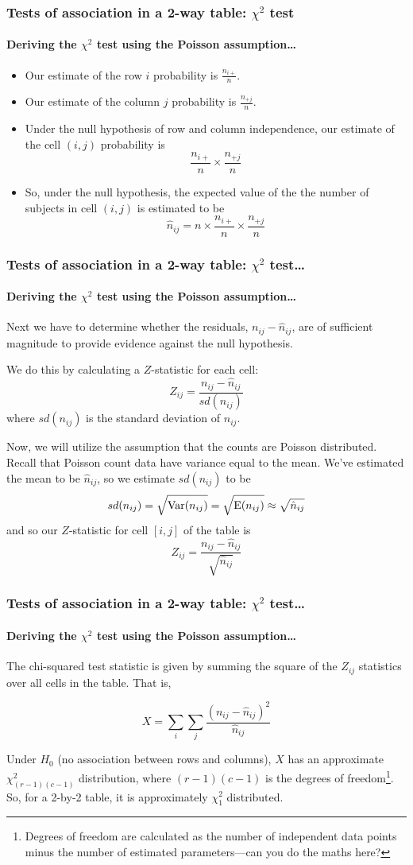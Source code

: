 \documentclass{beamer}\usepackage[]{graphicx}\usepackage[]{xcolor}
\begin{document}
\begin{frame}
\frametitle{Tests of association in a 2-way table: $\chi^2$ test}
\framesubtitle{Deriving the $\chi^2$ test using the Poisson assumption\ldots}
\begin{itemize}
\item Our estimate of the row $i$ probability is $\frac{n_{i+}}{n}$.
\item Our estimate of the column $j$ probability is $\frac{n_{+j}}{n}$.
\item Under the null hypothesis of row and column independence, our estimate of the cell $(i,j)$ probability is
\[ \frac{n_{i+}}{n} \times \frac{n_{+j}}{n} \]
\item So, under the null hypothesis, the expected value of the the number of subjects in cell $(i,j)$ is estimated to be
\[ \hat{n}_{ij} = n \times \frac{n_{i+}}{n} \times \frac{n_{+j}}{n} \]
\end{itemize}
\end{frame}


\begin{frame}
\frametitle{Tests of association in a 2-way table: $\chi^2$ test\ldots}
\framesubtitle{Deriving the $\chi^2$ test using the Poisson assumption\ldots}

Next we have to determine whether the residuals, $n_{ij}-\hat{n}_{ij}$, are of sufficient magnitude to provide evidence against the null hypothesis.

We do this by calculating a $Z$-statistic for each cell: \[ Z_{ij} = \frac{n_{ij}-\hat{n}_{ij}}{sd(n_{ij})} \] where $sd(n_{ij})$ is the standard deviation of $n_{ij}$.

\medskip

Now, we will utilize the assumption that the counts are Poisson distributed. Recall that Poisson count data have variance equal to the mean. We've estimated the mean to be $\hat{n}_{ij}$, so we estimate $sd(n_{ij})$ to be
\[ sd(n_{ij}) = \sqrt{\operatorname*{Var}(n_{ij})} = \sqrt{\operatorname{E}(n_{ij})} \approx \sqrt{\hat{n}_{ij}} \]
and so our $Z$-statistic for cell $[i,j]$ of the table is
\[ Z_{ij} = \frac{n_{ij}-\hat{n}_{ij}}{\sqrt{\hat{n}_{ij}}} \]

\end{frame}


\begin{frame}
\frametitle{Tests of association in a 2-way table: $\chi^2$ test\ldots}
\framesubtitle{Deriving the $\chi^2$ test using the Poisson assumption\ldots}

The chi-squared test statistic is given by summing the square of the $Z_{ij}$ statistics over all cells in the table. That is,

\[X = \sum_i\sum_j\frac{ (n_{ij}-\hat{n}_{ij})^2}{ \hat{n}_{ij}} \]

Under $H_0$ (no association between rows and columns), $X$ has an approximate $\chi_{(r-1)(c-1)}^2$ distribution, where $(r-1)(c-1)$ is the degrees of freedom\footnote{Degrees of freedom are calculated as the number of independent data points minus the number of estimated parameters---can you do the maths here?}. So, for a 2-by-2 table, it is approximately $\chi_1^2$ distributed.

\end{frame}
\end{document}
